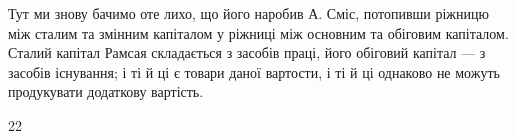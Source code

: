 Тут ми знову бачимо оте лихо, що його наробив А. Сміс, потопивши
ріжницю між сталим та змінним капіталом у ріжниці між основним та
обіговим капіталом. Сталий капітал Рамсая складається з засобів праці,
його обіговий капітал — з засобів існування; і ті й ці є товари даної
вартости, і ті й ці однаково не можуть продукувати додаткову
вартість.

22
